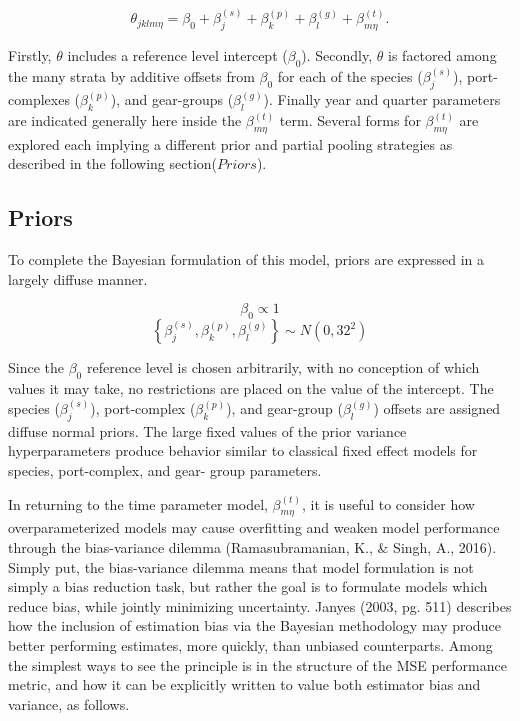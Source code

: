 \documentclass[12pt]{article}
\begin{document}
\[\theta_{jklm\eta} = \beta_0 + \beta^{(s)}_j + \beta^{(p)}_k + \beta^{(g)}_l + \beta^{(t)}_{m\eta}.\]

Firstly, \(\theta\) includes a reference level intercept (\(\beta_0\)).
Secondly, \(\theta\) is factored among the many strata by additive
offsets from \(\beta_0\) for each of the species (\(\beta^{(s)}_j\)),
port-complexes (\(\beta^{(p)}_k\)), and gear-groups (\(\beta^{(g)}_l\)).
Finally year and quarter parameters are indicated generally here inside
the \(\beta^{(t)}_{m\eta}\) term. Several forms for
\(\beta^{(t)}_{m\eta}\) are explored each implying a different prior and
partial pooling strategies as described in the following
section(\(Priors\)).

\subsection{Priors}\label{priors}

To complete the Bayesian formulation of this model, priors are expressed
in a largely diffuse manner.

\[\beta_0 \propto 1\]
\[\left\{\beta^{(s)}_j, \beta^{(p)}_k, \beta^{(g)}_l\right\} \sim N(0, 32^2)\]

Since the \(\beta_0\) reference level is chosen arbitrarily, with no
conception of which values it may take, no restrictions are placed on
the value of the intercept. The species (\(\beta^{(s)}_j\)),
port-complex (\(\beta^{(p)}_k\)), and gear-group (\(\beta^{(g)}_l\))
offsets are assigned diffuse normal priors. The large fixed values of
the prior variance hyperparameters produce behavior similar to classical
fixed effect models for species, port-complex, and gear- group
parameters.

In returning to the time parameter model, \(\beta^{(t)}_{m\eta}\), it is
useful to consider how overparameterized models may cause overfitting
and weaken model performance through the bias-variance dilemma
(Ramasubramanian, K., \& Singh, A., 2016). Simply put, the bias-variance
dilemma means that model formulation is not simply a bias reduction
task, but rather the goal is to formulate models which reduce bias,
while jointly minimizing uncertainty. Janyes (2003, pg. 511) describes
how the inclusion of estimation bias via the Bayesian methodology may
produce better performing estimates, more quickly, than unbiased
counterparts. Among the simplest ways to see the principle is in the
structure of the MSE performance metric, and how it can be explicitly
written to value both estimator bias and variance, as follows.
\end{document}
